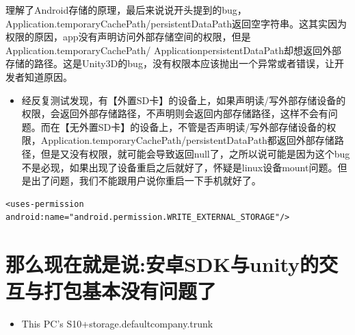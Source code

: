 \documentclass[9pt, b5paper]{article}
\begin{document}
理解了Android存储的原理，最后来说说开头提到的bug，Application.temporaryCachePath/persistentDataPath返回空字符串。这其实因为权限的原因，app没有声明访问外部存储空间的权限，但是Application.temporaryCachePath/ ApplicationpersistentDataPath却想返回外部存储的路径。这是Unity3D的bug，没有权限本应该抛出一个异常或者错误，让开发者知道原因。
\begin{itemize}
\item 经反复测试发现，有【外置SD卡】的设备上，如果声明读/写外部存储设备的权限，会返回外部存储路径，不声明则会返回内部存储路径，这样不会有问题。而在【无外置SD卡】的设备上，不管是否声明读/写外部存储设备的权限，Application.temporaryCachePath/persistentDataPath都返回外部存储路径，但是又没有权限，就可能会导致返回null了，之所以说可能是因为这个bug不是必现，如果出现了设备重启之后就好了，怀疑是linux设备mount问题。但是出了问题，我们不能跟用户说你重启一下手机就好了。
\end{itemize}
\begin{verbatim}
<uses-permission android:name="android.permission.WRITE_EXTERNAL_STORAGE"/>
\end{verbatim}

\section{那么现在就是说:安卓SDK与unity的交互与打包基本没有问题了}
\label{sec-10}
\begin{itemize}
\item This PC\HEYAN's S10+\Internal storage\Android\data\com.defaultcompany.trunk\files
\end{itemize}
\end{document}
